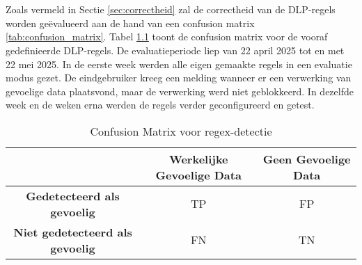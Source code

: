 
\chapter{}%
\label{ch:resultaten}

\section{}
\label{sec:res-vooraf-gedefinieerde-dlp-regels}


\subsection{}
\label{sec:functionaliteit-resultaten-vooraf}


\subsection{}
\label{sec:correctheid-resultaten-vooraf}

Zoals vermeld in Sectie \ref{sec:correctheid} zal de correctheid van de DLP-regels worden geëvalueerd aan de hand van een confusion matrix \ref{tab:confusion_matrix}. 
Tabel \ref{tab:confusion_matrix-vooraf} toont de confusion matrix voor de vooraf gedefinieerde DLP-regels. 
De evaluatieperiode liep van 22 april 2025 tot en met 22 mei 2025. 
In de eerste week werden alle eigen gemaakte regels in een evaluatie modus gezet. 
De eindgebruiker kreeg een melding wanneer er een verwerking van gevoelige data plaatsvond, maar de verwerking werd niet geblokkeerd. 
In dezelfde week en de weken erna werden de regels verder geconfigureerd en getest. 


\begin{table}[h]
    \centering
    \begin{tabular}{|c|c|c|}
        \hline
        \textbf{} & \textbf{Werkelijke Gevoelige Data} & \textbf{Geen Gevoelige Data} \\ \hline
        \textbf{Gedetecteerd als gevoelig} & TP & FP \\ \hline
        \textbf{Niet gedetecteerd als gevoelig} & FN & TN \\ \hline
    \end{tabular}
    \caption{Confusion Matrix voor regex-detectie}
    \label{tab:confusion_matrix-vooraf}
\end{table}


